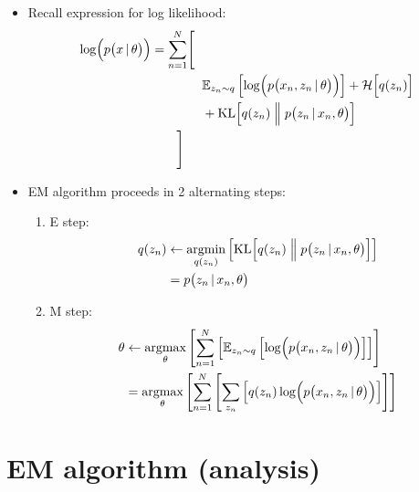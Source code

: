 \documentclass{article}
\begin{document}
\begin{itemize}
    \item Recall expression for log likelihood:
    \begin{align}
        \log\Bigl( p\bigl(x \,\vert\, \theta\bigr) \Bigr) &= \sum_{n=1}^N \Biggl[ \nonumber \\
        &\qquad\qquad \mathbb{E}_{z_n\sim q}\left[ \log\Bigl( p\bigl(x_n, z_n \,\vert\, \theta\bigr) \Bigr) \right] + \mathcal{H} \Bigl[ q(z_n) \Bigr] \nonumber \\
        &\qquad\qquad + \text{KL}\Bigl[ q(z_n) \Bigm\Vert p\bigl(z_n \,\vert\, x_n, \theta\bigr) \Bigr] \nonumber \\
        &\qquad \Biggr]
    \end{align}
    \item EM algorithm proceeds in 2 alternating steps:
    \begin{enumerate}
        \item E step:
        \begin{align}
            q(z_n) &\leftarrow \underset{q(z_n)}{\text{argmin}}\left[ \text{KL}\Bigl[ q(z_n) \Bigm\Vert p\bigl(z_n \,\vert\, x_n, \theta\bigr) \Bigr] \right] \\
            &= p\bigl(z_n \,\vert\, x_n, \theta\bigr)
        \end{align}
        \item M step:
        \begin{align}
            \theta &\leftarrow \underset{\theta}{\text{argmax}}\left[ \sum_{n=1}^N \left[ \mathbb{E}_{z_n\sim q}\left[ \log\Bigl( p\bigl(x_n, z_n \,\vert\, \theta\bigr) \Bigr) \right] \right] \right] \\
            &= \underset{\theta}{\text{argmax}}\left[ \sum_{n=1}^N \left[ \sum_{z_n}\left[ q(z_n) \log\Bigl( p\bigl(x_n, z_n \,\vert\, \theta\bigr) \Bigr) \right] \right] \right]
        \end{align}
    \end{enumerate}
\end{itemize}

\newpage
\section{EM algorithm (analysis)}
\end{document}
